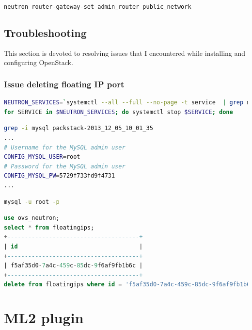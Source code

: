 \documentclass[11pt,letterpaper,oneside]{book}
\begin{document}
\begin{lstlisting}[caption={Set the router gateway},language=bash]
neutron router-gateway-set admin_router public_network
\end{lstlisting}




\subsection{Troubleshooting}
This section is devoted to resolving issues that I encountered while installing and configuring OpenStack.
\subsubsection{Issue deleting floating IP port}
\begin{lstlisting}[caption={Stop Neutron Services},language=bash]
NEUTRON_SERVICES=`systemctl --all --full --no-page -t service  | grep neutron | awk '{print $1}'`
for SERVICE in $NEUTRON_SERVICES; do systemctl stop $SERVICE; done
\end{lstlisting}

\begin{lstlisting}[caption={Find the MariaDB root password},language=bash]
grep -i mysql packstack-2013_12_05_10_01_35 
...
# Username for the MySQL admin user
CONFIG_MYSQL_USER=root
# Password for the MySQL admin user
CONFIG_MYSQL_PW=5729f733fd9f4731
...
\end{lstlisting}
\begin{lstlisting}[caption={Login to MariaDB},language=bash]
mysql -u root -p
\end{lstlisting}
\begin{lstlisting}[caption={Get the ID for the floating IP and delete},language=sql]
use ovs_neutron;
select * from floatingips;
+--------------------------------------+
| id                                   |
+--------------------------------------+
| f5af35d0-7a4c-459c-85dc-9f6af9fb1b6c |
+--------------------------------------+
delete from floatingips where id = 'f5af35d0-7a4c-459c-85dc-9f6af9fb1b6c'
\end{lstlisting}

\section{ML2 plugin}

\end{document}
